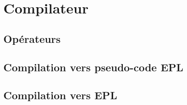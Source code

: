 \chapter{Compilateur}
\begin{preamble}

\end{preamble}
{
}
\section{Opérateurs}
\section{Compilation vers pseudo-code EPL}

\section{Compilation vers EPL}
